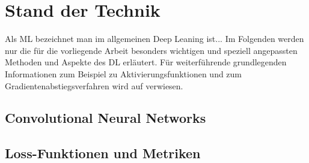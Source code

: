 \section{Stand der Technik}

Als ML bezeichnet man im allgemeinen Deep Leaning ist... Im Folgenden werden nur die für die vorliegende Arbeit besonders wichtigen und speziell angepassten Methoden und Aspekte des DL erläutert. Für weiterführende grundlegenden Informationen zum Beispiel zu Aktivierungsfunktionen und zum Gradientenabstiegsverfahren wird auf \cite{dlbook2018} verwiesen.

\subsection{Convolutional Neural Networks}

\subsection{Loss-Funktionen und Metriken}